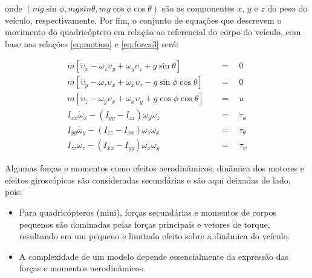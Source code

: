 \documentclass[a4paper, 12pt]{article}
\begin{document}
\noindent onde $(mg\sin{\phi},mgsin{\theta},mg\cos{\phi}\cos{\theta})$ são as componentes $x$, $y$ e $z$ do peso do veículo, respectivamente. Por fim, o conjunto de equações que descrevem o movimento do quadricóptero em relação ao referencial do corpo do veículo, com base nas relações \ref{eq:motion} e \ref{eq:forca3} será:

\begin{equation}
\begin{aligned}
	m\left[ { \dot { \upsilon  }  }_{ x } - { \omega  }_{ z }\upsilon_{ y } + { \omega  }_{ y }{ \upsilon  }_{ z } + g\sin{\theta} \right] \quad &=\quad 0 \\ 
	m\left[ { \dot { \upsilon  }  }_{ y } - { \omega  }_{ z }\upsilon_{ x } + { \omega  }_{ x }{ \upsilon  }_{ z } - g\sin{\phi}\cos{\theta} \right] \quad &=\quad 0 \\
	m\left[ { \dot { \upsilon  }  }_{ z } - { \omega  }_{ y }\upsilon_{ x } + { \omega  }_{ x }{ \upsilon  }_{ y } + g\cos{\phi}\cos{\theta} \right] \quad &=\quad u \\ 
	{ I }_{ xx }{ \dot { \omega  }  }_{ x } - (I_{ yy } - I_{ zz }){ \omega  }_{ y }{ \omega  }_{ z }\quad &=\quad \tau_{\phi} \\
	{ I }_{ yy }{ \dot { \omega  }  }_{ y } - (I_{ zz } - I_{ xx }){ \omega  }_{ z }{ \omega  }_{ x }\quad &=\quad \tau_{\theta}\\
	{ I }_{ zz }{ \dot { \omega  }  }_{ z } - (I_{ xx } - I_{ yy }){ \omega  }_{ x }{ \omega  }_{ y }\quad &=\quad \tau_{\psi} 
\end{aligned}
\label{eq:forca4}
\end{equation}

Algumas forças e momentos como efeitos aerodinâmicos, dinâmica dos motores e efeitos giroscópicos são consideradas secundárias e são aqui deixadas de lado, pois:

\begin{itemize}
\item	Para quadricópteros (mini), forças secundárias e momentos de corpos pequenos são dominadas pelas forças principais e vetores de torque, resultando em um pequeno e limitado efeito sobre a dinâmica do veículo.
\item A complexidade de um modelo depende essencialmente da expressão das forças e momentos aerodinâmicos.
\end{itemize}





\newpage


 

\newpage
\end{document}
